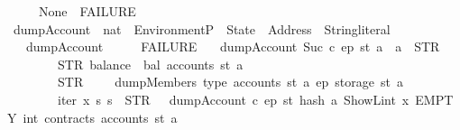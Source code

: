 \begin{isabellebody}
\ \ \ \ {\isacharbar}{\kern0pt}\ None\ {\isasymRightarrow}\ FAILURE{\isacharparenright}{\kern0pt}{\isachardoublequoteclose}\isanewline
\isanewline
\isanewline
{}\isamarkupfalse%
\ dump\isactrlsub A\isactrlsub c\isactrlsub c\isactrlsub o\isactrlsub u\isactrlsub n\isactrlsub t\ {\isacharcolon}{\kern0pt}{\isacharcolon}{\kern0pt}\ {\isachardoublequoteopen}nat\ {\isasymRightarrow}\ Environment\isactrlsub P\ {\isasymRightarrow}\ State\ {\isasymRightarrow}\ Address\ {\isasymRightarrow}\ String{\isachardot}{\kern0pt}literal{\isachardoublequoteclose}\isanewline
\ \ \ {\isachardoublequoteopen}dump\isactrlsub A\isactrlsub c\isactrlsub c\isactrlsub o\isactrlsub u\isactrlsub n\isactrlsub t\ {}\ {\isacharunderscore}{\kern0pt}\ {\isacharunderscore}{\kern0pt}\ {\isacharunderscore}{\kern0pt}\ {\isacharequal}{\kern0pt}\ FAILURE{\isachardoublequoteclose}\isanewline
\ \ {\isacharbar}{\kern0pt}\ {\isachardoublequoteopen}dump\isactrlsub A\isactrlsub c\isactrlsub c\isactrlsub o\isactrlsub u\isactrlsub n\isactrlsub t\ {\isacharparenleft}{\kern0pt}Suc\ c{\isacharparenright}{\kern0pt}\ ep\ st\ a\ {\isacharequal}{\kern0pt}\ a\ {\isacharplus}{\kern0pt}\ STR\ {\isacharprime}{\kern0pt}{\isacharprime}{\kern0pt}{\isacharcolon}{\kern0pt}\ {\isacharprime}{\kern0pt}{\isacharprime}{\kern0pt}\ {\isacharplus}{\kern0pt}\isanewline
\ \ \ \ \ \ \ \ STR\ {\isacharprime}{\kern0pt}{\isacharprime}{\kern0pt}balance{\isacharequal}{\kern0pt}{\isacharequal}{\kern0pt}{\isacharprime}{\kern0pt}{\isacharprime}{\kern0pt}\ {\isacharplus}{\kern0pt}\ bal\ {\isacharparenleft}{\kern0pt}accounts\ st\ a{\isacharparenright}{\kern0pt}\ {\isacharplus}{\kern0pt}\isanewline
\ \ \ \ \ \ \ \ STR\ {\isacharprime}{\kern0pt}{\isacharprime}{\kern0pt}\ {\isacharminus}{\kern0pt}\ {\isacharprime}{\kern0pt}{\isacharprime}{\kern0pt}\ {\isacharplus}{\kern0pt}\ dumpMembers\ {\isacharparenleft}{\kern0pt}type\ {\isacharparenleft}{\kern0pt}accounts\ st\ a{\isacharparenright}{\kern0pt}{\isacharparenright}{\kern0pt}\ ep\ {\isacharparenleft}{\kern0pt}storage\ st\ a{\isacharparenright}{\kern0pt}\ {\isacharplus}{\kern0pt}\isanewline
\ \ \ \ \ \ \ \ iter\ {\isacharparenleft}{\kern0pt}{\isasymlambda}x\ s{\isachardot}{\kern0pt}\ s\ {\isacharplus}{\kern0pt}\ STR\ {\isacharprime}{\kern0pt}{\isacharprime}{\kern0pt}{\isasymnewline}{\isacharprime}{\kern0pt}{\isacharprime}{\kern0pt}\ {\isacharplus}{\kern0pt}\ dump\isactrlsub A\isactrlsub c\isactrlsub c\isactrlsub o\isactrlsub u\isactrlsub n\isactrlsub t\ c\ ep\ st\ {\isacharparenleft}{\kern0pt}hash\ a\ {\isacharparenleft}{\kern0pt}ShowL\isactrlsub i\isactrlsub n\isactrlsub t\ x{\isacharparenright}{\kern0pt}{\isacharparenright}{\kern0pt}{\isacharparenright}{\kern0pt}\ EMPTY\ {\isacharparenleft}{\kern0pt}int\ {\isacharparenleft}{\kern0pt}contracts\ {\isacharparenleft}{\kern0pt}accounts\ st\ a{\isacharparenright}{\kern0pt}{\isacharparenright}{\kern0pt}{\isacharparenright}{\kern0pt}{\isachardoublequoteclose}\isanewline

\end{isabellebody}
